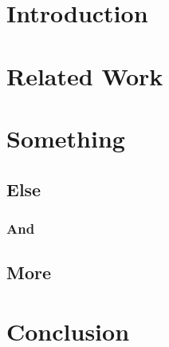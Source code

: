 \chapter{Introduction} %

\blindtext[2]


\chapter{Related Work} %

\blindtext[2]
\cite{Tolk12}


\chapter{Something} %

\blindtext[2]

\section{Else}

\subsection{And}
\blindtext[1]

\section{More}
\blindtext[1]

\chapter{Conclusion} %

\blindtext[2]